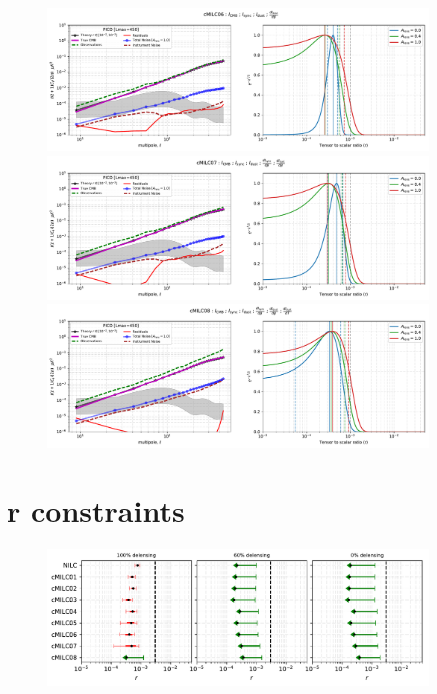\documentclass[11pt]{article}
\begin{document}
\begin{figure}
\centering
\includegraphics[width=0.9\textwidth]{ps_and_bbposterir_cMILC06.pdf}
\includegraphics[width=0.9\textwidth]{ps_and_bbposterir_cMILC07.pdf}
\includegraphics[width=0.9\textwidth]{ps_and_bbposterir_cMILC08.pdf}
\end{figure}


\newpage
\section{r constraints}
\begin{figure}
\centering
\includegraphics[width=0.9\textwidth]{PICO_summary_statistics_lmin002.pdf}
\end{figure}
\end{document}
